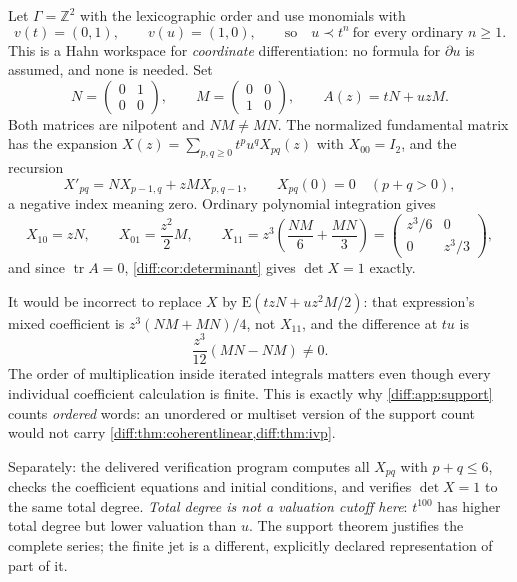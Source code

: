 \documentclass[11pt,letterpaper]{article}
\numberwithin{equation}{section}
\theoremstyle{definition}
\theoremstyle{remark}
\newcommand{\Z}{\mathbb Z}
\newcommand{\der}{\partial}
\newcommand{\Emm}{\mathrm{E}}
\newcommand{\tr}{\operatorname{tr}}
\begin{document}
Let $\Gamma=\Z^{2}$ with the lexicographic order and use monomials with
\[
 v(t)=(0,1),\qquad v(u)=(1,0),
 \qquad\text{so}\quad u\prec t^{n}\ \text{for every ordinary }n\geq1 .
\]
This is a Hahn workspace for \emph{coordinate} differentiation: no formula for
$\der u$ is assumed, and none is needed. Set
\[
 N=\begin{pmatrix}0&1\\0&0\end{pmatrix},\qquad
 M=\begin{pmatrix}0&0\\1&0\end{pmatrix},\qquad
 A(z)=tN+uzM .
\]
Both matrices are nilpotent and $NM\neq MN$. The normalized fundamental matrix
has the expansion $X(z)=\sum_{p,q\geq0}t^{p}u^{q}X_{pq}(z)$ with
$X_{00}=I_{2}$, and the recursion
\begin{equation}\label{diff:eq:twoscale}
 X'_{pq}=N X_{p-1,q}+zM X_{p,q-1},
 \qquad X_{pq}(0)=0\quad(p+q>0),
\end{equation}
a negative index meaning zero. Ordinary polynomial integration gives
\[
 X_{10}=zN,\qquad X_{01}=\frac{z^{2}}{2}M,
 \qquad
 X_{11}=z^{3}\left(\frac{NM}{6}+\frac{MN}{3}\right)
 =\begin{pmatrix}z^{3}/6&0\\0&z^{3}/3\end{pmatrix},
\]
and since $\tr A=0$, \cref{diff:cor:determinant} gives $\det X=1$ exactly.

\begin{warning}
\label{diff:warn:twoscale}
It would be incorrect to replace $X$ by $\Emm(tzN+uz^{2}M/2)$: that
expression's mixed coefficient is $z^{3}(NM+MN)/4$, not $X_{11}$, and the
difference at $tu$ is
\[
 \frac{z^{3}}{12}(MN-NM)\neq0 .
\]
The order of multiplication inside iterated integrals matters even though
every individual coefficient calculation is finite. This is exactly why
\cref{diff:app:support} counts \emph{ordered} words: an unordered or multiset
version of the support count would not carry
\cref{diff:thm:coherentlinear,diff:thm:ivp}.

Separately: the delivered verification program computes all $X_{pq}$ with
$p+q\leq6$, checks the coefficient equations and initial conditions, and
verifies $\det X=1$ to the same total degree. \emph{Total degree is not a
valuation cutoff here}: $t^{100}$ has higher total degree but lower valuation
than $u$. The support theorem justifies the complete series; the finite jet is
a different, explicitly declared representation of part of it.
\end{warning}
\end{document}
